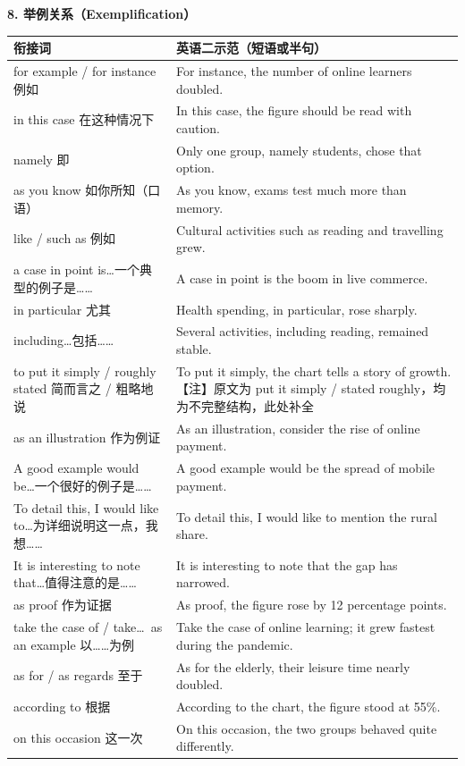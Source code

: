 \documentclass[11pt,a4paper]{ctexart}
\begin{document}
\par\addvspace{6pt}\noindent\textbf{8. 举例关系（Exemplification）}\par\addvspace{2pt}
\begin{longtable}{L{5.4cm}L{10.6cm}}
\toprule
\textbf{衔接词} & \textbf{英语二示范（短语或半句）} \\
\midrule
\endhead
for example / for instance 例如 & For instance, the number of online learners doubled. \\
in this case 在这种情况下 & In this case, the figure should be read with caution. \\
namely 即 & Only one group, namely students, chose that option. \\
as you know 如你所知（口语） & As you know, exams test much more than memory. \\
like / such as 例如 & Cultural activities such as reading and travelling grew. \\
a case in point is\ldots 一个典型的例子是…… & A case in point is the boom in live commerce. \\
in particular 尤其 & Health spending, in particular, rose sharply. \\
including\ldots 包括…… & Several activities, including reading, remained stable. \\
to put it simply / roughly stated 简而言之 / 粗略地说 & To put it simply, the chart tells a story of growth.【注】原文为 put it simply / stated roughly，均为不完整结构，此处补全 \\
as an illustration 作为例证 & As an illustration, consider the rise of online payment. \\
A good example would be\ldots 一个很好的例子是…… & A good example would be the spread of mobile payment. \\
To detail this, I would like to\ldots 为详细说明这一点，我想…… & To detail this, I would like to mention the rural share. \\
It is interesting to note that\ldots 值得注意的是…… & It is interesting to note that the gap has narrowed. \\
as proof 作为证据 & As proof, the figure rose by 12 percentage points. \\
take the case of / take\ldots\ as an example 以……为例 & Take the case of online learning; it grew fastest during the pandemic. \\
as for / as regards 至于 & As for the elderly, their leisure time nearly doubled. \\
according to 根据 & According to the chart, the figure stood at 55\%. \\
on this occasion 这一次 & On this occasion, the two groups behaved quite differently. \\
\bottomrule
\end{longtable}
\end{document}
